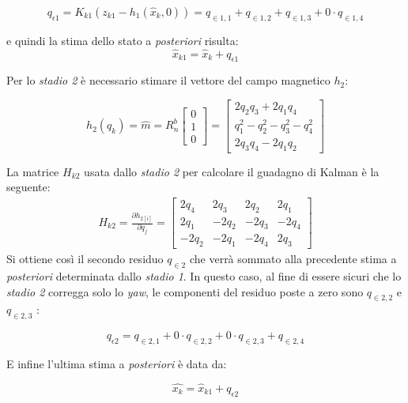 \begin{equation}
q_{\epsilon 1}= K_{k1}(z_{k1}-h_1(\hat{x}_k,0))= q_{\in1,1} + q_{\in1,2} + q_{\in1,3} + 0 \cdot q_{\in1,4} 
\end{equation}

e quindi la stima dello stato a \textit{posteriori} risulta:
\begin{equation}
\hat{x}_{k1}= \hat{x}_k + q_{\epsilon 1}
\end{equation}

Per lo \textit{stadio 2} è necessario stimare il vettore del campo magnetico $h_2$:

\begin{equation}
h_2(q_k) = \hat{m} = R_n^b \begin{bmatrix}
0 \\
1 \\
0
\end{bmatrix} = 
\begin{bmatrix}
2q_2q_3 + 2q_1q_4 \\
q_1^2 - q_2^2 - q_3^2 - q_4^2 \\
2q_3q_4 - 2q_1q_2
\end{bmatrix} 
\end{equation}

La matrice $H_{k2}$ usata dallo \textit{stadio 2} per calcolare il guadagno di Kalman è la seguente:
\begin{eqnarray}
H_{k2}= \frac{\partial h_{2[i]}}{\partial q_j}=  \begin{bmatrix}
2q_4 & 2q_3 & 2q_2 & 2q_1  \\
2q_1 & -2q_2 & -2q_3 & -2q_4\\
-2q_2 & -2q_1 & -2q_4 & 2q_3
\end{bmatrix}
\end{eqnarray}  
Si ottiene così il secondo residuo $q_{\in 2}$ che verrà sommato alla precedente stima a \textit{posteriori} determinata dallo \textit{stadio 1}. In questo caso, al fine di essere sicuri che lo \textit{stadio 2} corregga solo lo \textit{yaw}, le componenti del residuo poste a zero sono $q_{\in 2,2}$ e $q_{\in 2,3}$ :

\begin{equation}
q_{\epsilon 2}= q_{\in2,1} + 0 \cdot q_{\in2,2} + 0 \cdot q_{\in2,3} + q_{\in2,4} 
\end{equation}

E infine l'ultima stima a \textit{posteriori} è data da:

\begin{equation}
\hat{x_{k}} = \hat{x}_{k1} + q_{\epsilon 2}
\end{equation}



